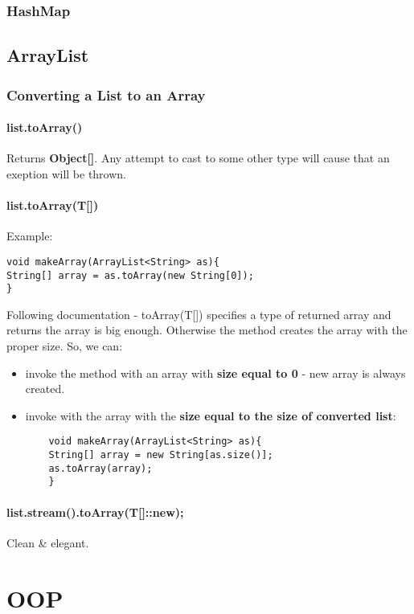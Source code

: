 \documentclass{report}
\begin{document}
\section{HashMap}

\chapter{ArrayList}
\section{Converting a List to an Array}
\subsection{list.toArray()}
Returns \textbf{Object[]}. Any attempt to cast to some other type will cause that an exeption will be thrown.

\subsection{list.toArray(T[])}
Example:
\begin{verbatim}
void makeArray(ArrayList<String> as){
String[] array = as.toArray(new String[0]);
}
\end{verbatim}

Following documentation - toArray(T[]) specifies a type of returned array and returns the array is big enough. Otherwise the method creates the array with the proper size.
So, we can:
\begin{itemize}
	\item invoke the method with an array with \textbf{size equal to 0} - new array is always created.
	\item invoke with the array with the \textbf{size equal to the size of converted list}:
	\begin{verbatim}
	void makeArray(ArrayList<String> as){
	String[] array = new String[as.size()];
	as.toArray(array);
	}
	\end{verbatim}
\end{itemize}

\subsection{list.stream().toArray(T[]::new);}
Clean \& elegant.


\part{OOP} 
\end{document}
